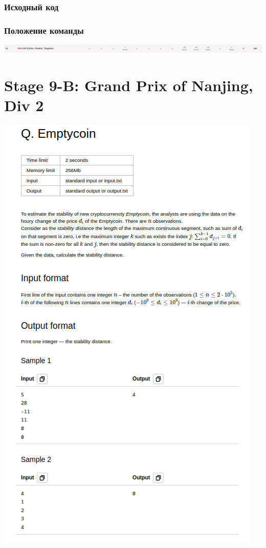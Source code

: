 \documentclass[12pt]{article}
\begin{document}
\subsubsection*{Исходный код}

\subsubsection*{Положение команды}
\includegraphics[scale=0.25]{images/8.png}\newline\noindent

\pagebreak
\section{Stage 9-B: Grand Prix of Nanjing, Div 2}
\includegraphics[scale=0.75]{statements/9_Q.png}
\end{document}
